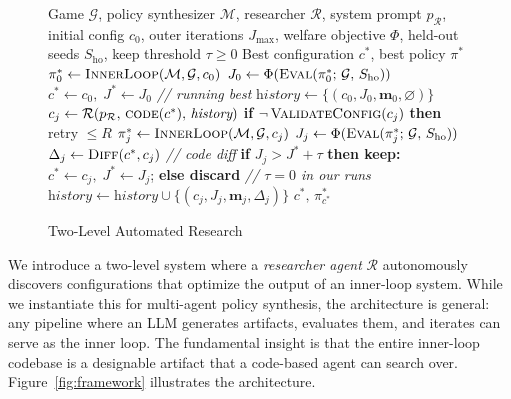 \documentclass{article}
\newcommand{\cR}{\mathcal{R}}
\newcommand{\cM}{\mathcal{M}}
\newcommand{\cG}{\mathcal{G}}
\newcommand{\bm}{\mathbf{m}}
\begin{document}
\begin{figure}[t]
\begin{minipage}[t]{0.45\linewidth}
\label{fig:framework}
\end{minipage}\hfill
\begin{minipage}[t]{0.52\linewidth}
\vspace{0pt}
\begin{algorithm}[H]
\caption{Two-Level Automated Research}
\label{alg:outer}
\begin{algorithmic}[1]
\footnotesize
\Require Game $\cG$, policy synthesizer $\cM$, researcher $\cR$, system prompt $p_{\cR}$, initial config $c_0$, outer iterations $J_{\max}$, welfare objective $\Phi$, held-out seeds $S_{\textrm{ho}}$, keep threshold $\tau \geq 0$
\Ensure Best configuration $c^*$, best policy $\pi^*$
\State $\pi^*_0 \leftarrow \textsc{InnerLoop}(\cM, \cG, c_0)$
\State $J_0 \leftarrow \Phi(\textsc{Eval}(\pi^*_0;\, \cG,\, S_{\textrm{ho}}))$
\State $c^* \leftarrow c_0,\; J^* \leftarrow J_0$ \hfill {\scriptsize\textit{// running best}}
\State $\textit{history} \leftarrow \{(c_0, J_0, \bm_0, \varnothing)\}$
  \State $c_j \leftarrow \cR\!\left(p_{\cR},\, \textsc{code}(c^*),\, \textit{history}\right)$
  \State \textbf{if} $\neg\,\textsc{ValidateConfig}(c_j)$ \textbf{then} retry $\leq R$
  \State $\pi^*_j \leftarrow \textsc{InnerLoop}(\cM, \cG, c_j)$
  \State $J_j \leftarrow \Phi(\textsc{Eval}(\pi^*_j;\, \cG,\, S_{\textrm{ho}}))$
  \State $\Delta_j \leftarrow \textsc{Diff}(c^*, c_j)$ \hfill {\scriptsize\textit{// code diff}}
  \State \textbf{if} $J_j > J^* + \tau$ \textbf{then keep:} $c^* \leftarrow c_j,\; J^* \leftarrow J_j$;\; \textbf{else discard} \hfill {\scriptsize\textit{// $\tau=0$ in our runs}}
  \State $\textit{history} \leftarrow \textit{history} \cup \{(c_j, J_j, \bm_j, \Delta_j)\}$
\EndFor
\State \Return $c^*,\, \pi^*_{c^*}$
\end{algorithmic}
\end{algorithm}
\end{minipage}
\end{figure}
We introduce a two-level system where a \emph{researcher agent} $\cR$ autonomously discovers configurations that optimize the output of an inner-loop system. While we instantiate this for multi-agent policy synthesis, the architecture is general: any pipeline where an LLM generates artifacts, evaluates them, and iterates can serve as the inner loop. The fundamental insight is that the entire inner-loop codebase is a designable artifact that a code-based agent can search over. Figure~\ref{fig:framework} illustrates the architecture.
\end{document}
